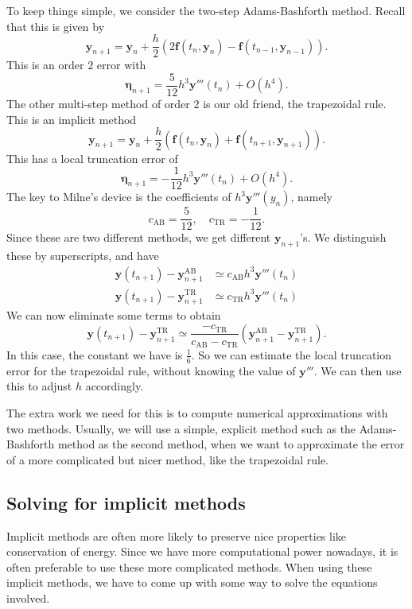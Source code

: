 \documentclass[a4paper]{article}
\begin{document}
To keep things simple, we consider the two-step Adams-Bashforth method. Recall that this is given by
\[
  \mathbf{y}_{n + 1} = \mathbf{y}_n + \frac{h}{2} (2 \mathbf{f}(t_n, \mathbf{y}_n) - \mathbf{f}(t_{n - 1}, \mathbf{y}_{n - 1})).
\]
This is an order $2$ error with
\[
  \boldsymbol\eta_{n + 1} = \frac{5}{12}h^3 \mathbf{y}'''(t_n) + O(h^4).
\]
The other multi-step method of order $2$ is our old friend, the trapezoidal rule. This is an implicit method
\[
  \mathbf{y}_{n + 1} = \mathbf{y}_n + \frac{h}{2} (\mathbf{f}(t_n, \mathbf{y}_n) + \mathbf{f}(t_{n + 1}, \mathbf{y}_{n + 1})).
\]
This has a local truncation error of
\[
  \boldsymbol\eta_{n + 1} = -\frac{1}{12}h^3 \mathbf{y}'''(t_n) + O(h^4).
\]
The key to Milne's device is the coefficients of $h^3 \mathbf{y}'''(y_n)$, namely
\[
  c_{\mathrm{AB}} = \frac{5}{12},\quad c_{\mathrm{TR}} = -\frac{1}{12}.
\]
Since these are two different methods, we get different $\mathbf{y}_{n + 1}$'s. We distinguish these by superscripts, and have
\begin{align*}
  \mathbf{y}(t_{n + 1}) - \mathbf{y}_{n + 1}^{\mathrm{AB}} &\simeq c_{\mathrm{AB}} h^3 \mathbf{y}'''(t_n)\\
  \mathbf{y}(t_{n + 1}) - \mathbf{y}_{n + 1}^{\mathrm{TR}} &\simeq c_{\mathrm{TR}} h^3 \mathbf{y}'''(t_n)
\end{align*}
We can now eliminate some terms to obtain
\[
  \mathbf{y}(t_{n + 1}) - \mathbf{y}_{n + 1}^{\mathrm{TR}} \simeq \frac{-c_{\mathrm{TR}}}{c_{\mathrm{AB}} - c_{\mathrm{TR}}} (\mathbf{y}_{n + 1}^{\mathrm{AB}} - \mathbf{y}_{n + 1}^{\mathrm{TR}}).
\]
In this case, the constant we have is $\frac{1}{6}$. So we can estimate the local truncation error for the trapezoidal rule, without knowing the value of $\mathbf{y}'''$. We can then use this to adjust $h$ accordingly.

The extra work we need for this is to compute numerical approximations with two methods. Usually, we will use a simple, explicit method such as the Adams-Bashforth method as the second method, when we want to approximate the error of a more complicated but nicer method, like the trapezoidal rule.

\subsection{Solving for implicit methods}
Implicit methods are often more likely to preserve nice properties like conservation of energy. Since we have more computational power nowadays, it is often preferable to use these more complicated methods. When using these implicit methods, we have to come up with some way to solve the equations involved.
\end{document}
